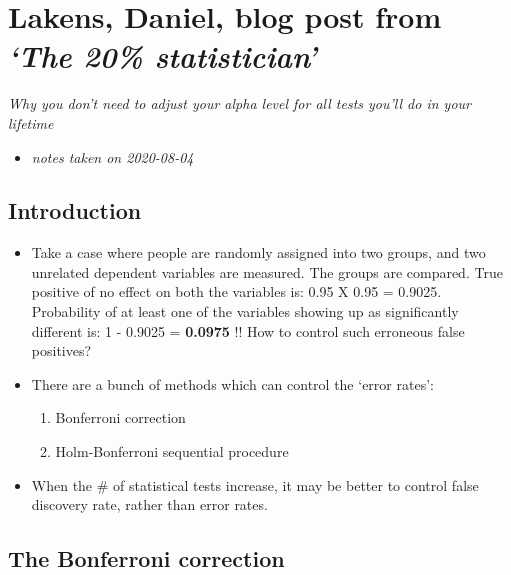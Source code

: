 \documentclass[
]{book}
\providecommand{\tightlist}{%
  \setlength{\itemsep}{0pt}\setlength{\parskip}{0pt}}
\begin{document}
\hypertarget{lakens-daniel-blog-post-from-the-20-statistician}{%
\chapter{\texorpdfstring{Lakens, Daniel, blog post from \emph{`The 20\% statistician'}}{Lakens, Daniel, blog post from `The 20\% statistician'}}\label{lakens-daniel-blog-post-from-the-20-statistician}}


\emph{Why you don't need to adjust your alpha level for all tests you'll do in your lifetime} \citep{daniellakensa_2016}

\begin{itemize}
\tightlist
\item
  \emph{notes taken on 2020-08-04}
\end{itemize}

\hypertarget{introduction}{%
\section{Introduction}\label{introduction}}

\begin{itemize}
\item
  Take a case where people are randomly assigned into two groups, and two unrelated dependent variables are measured. The groups are compared. True positive of no effect on both the variables is: 0.95 X 0.95 = 0.9025. Probability of at least one of the variables showing up as significantly different is: 1 - 0.9025 = \textbf{0.0975} !! How to control such erroneous false positives?
\item
  There are a bunch of methods which can control the `error rates':

  \begin{enumerate}
  \def\labelenumi{\arabic{enumi}.}
  \tightlist
  \item
    Bonferroni correction
  \item
    Holm-Bonferroni sequential procedure
  \end{enumerate}
\item
  When the \# of statistical tests increase, it may be better to control false discovery rate, rather than error rates.
\end{itemize}

\hypertarget{the-bonferroni-correction}{%
\section{The Bonferroni correction}\label{the-bonferroni-correction}}
\end{document}
